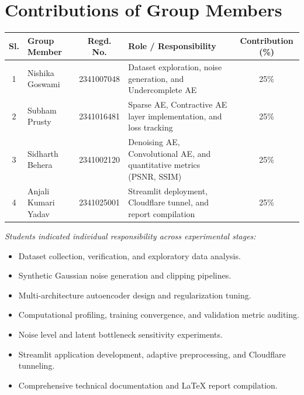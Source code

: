 \documentclass[12pt, a4paper]{article}
\begin{document}
\newpage
\section{Contributions of Group Members}

\noindent
\begin{tabularx}{\textwidth}{|c|X|c|X|c|}
\hline
\textbf{Sl.} & \textbf{Group Member} & \textbf{Regd. No.} & \textbf{Role / Responsibility} & \textbf{Contribution (\%)} \\
\hline
1 & Nishika Goswami & 2341007048 & Dataset exploration, noise generation, and Undercomplete AE & 25\% \\
\hline
2 & Subham Prusty & 2341016481 & Sparse AE, Contractive AE layer implementation, and loss tracking & 25\% \\
\hline
3 & Sidharth Behera & 2341002120 & Denoising AE, Convolutional AE, and quantitative metrics (PSNR, SSIM) & 25\% \\
\hline
4 & Anjali Kumari Yadav & 2341025001 & Streamlit deployment, Cloudflare tunnel, and report compilation & 25\% \\
\hline
\end{tabularx}

\vspace{0.6cm}
\noindent \textit{Students indicated individual responsibility across experimental stages:}
\begin{itemize}[noitemsep, topsep=5pt]
    \item Dataset collection, verification, and exploratory data analysis.
    \item Synthetic Gaussian noise generation and clipping pipelines.
    \item Multi-architecture autoencoder design and regularization tuning.
    \item Computational profiling, training convergence, and validation metric auditing.
    \item Noise level and latent bottleneck sensitivity experiments.
    \item Streamlit application development, adaptive preprocessing, and Cloudflare tunneling.
    \item Comprehensive technical documentation and LaTeX report compilation.
\end{itemize}
\end{document}
